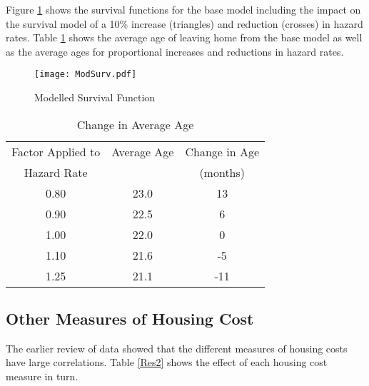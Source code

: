 \documentclass[12pt]{article}
\begin{document}
Figure \ref{modSurv} shows the survival functions for the base model including the impact on the survival model of a 10\% increase (triangles) and reduction (crosses) in hazard rates. Table \ref{ageFactor} shows the average age of leaving home from the base model as well as the average ages for proportional increases and reductions in hazard rates.

 \begin{figure}[htpb]
   \caption{Modelled Survival Function}
   \label{modSurv}
   \centering
   \texttt{[image: ModSurv.pdf]}
 \end{figure}

\begin{table}[htpb] \centering
\begin{threeparttable}
 \caption{Change in Average Age}
 \label{ageFactor}
 \begin{tabular}{@{}ccc@{}}
 \toprule
 Factor Applied to  & Average Age & Change in Age \\
 Hazard Rate &&(months) \\
 \midrule
   0.80 & 23.0 & 13 \\
   0.90 & 22.5 & 6 \\
   1.00 & 22.0 & 0 \\
   1.10 & 21.6 & -5 \\
   1.25 & 21.1 & -11 \\
 \bottomrule
\end{tabular}
\end{threeparttable}
\end{table}

\subsection{Other Measures of Housing Cost}
The earlier review of data showed that the different measures of housing costs have large correlations. Table \ref{Res2} shows the effect of each housing cost measure in turn.
\end{document}
